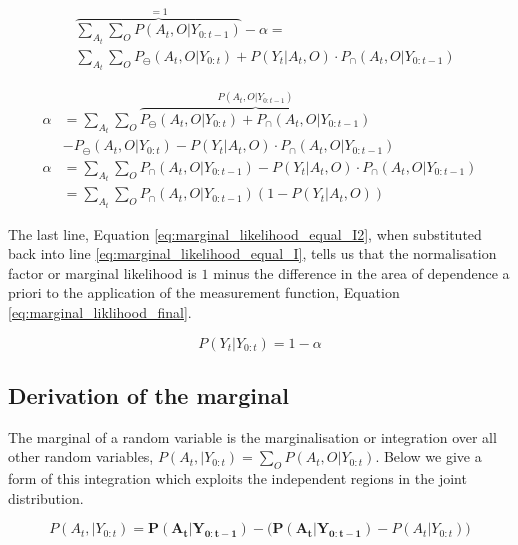 \begin{align}		  
 &\overbrace{\sum\limits_{A_t}\sum\limits_{O} P(A_t,O|Y_{0:t-1})}^{=1} - \alpha  = \nonumber \\ 
      &\sum\limits_{A_t}\sum\limits_{O} P_{\ominus}(A_t,O|Y_{0:t}) + P(Y_t|A_t,O)\cdot P_{\cap}(A_t,O|Y_{0:t-1})
\end{align}

\begin{align}   
   \alpha &= \sum\limits_{A_t}\sum\limits_{O}  \overbrace{P_{\ominus}(A_t,O|Y_{0:t}) + P_{\cap}(A_t,O|Y_{0:t-1})}^{P(A_t,O|Y_{0:t-1})}\nonumber\\ 
     & - P_{\ominus}(A_t,O|Y_{0:t}) - P(Y_t|A_t,O)\cdot P_{\cap}(A_t,O|Y_{0:t-1}) \\
    \alpha &= \sum\limits_{A_t}\sum\limits_{O} P_{\cap}(A_t,O|Y_{0:t-1}) - P(Y_t|A_t,O)\cdot P_{\cap}(A_t,O|Y_{0:t-1}) \\
	   &= \sum\limits_{A_t}\sum\limits_{O} P_{\cap}(A_t,O|Y_{0:t-1}) (1 - P(Y_t|A_t,O)) \label{eq:marginal_likelihood_equal_I2}
\end{align}

The last line, Equation \ref{eq:marginal_likelihood_equal_I2}, when substituted back into line \ref{eq:marginal_likelihood_equal_I}, tells us that the 
normalisation factor or marginal likelihood is $1$ minus the difference in the area of dependence a priori to the application of 
the measurement function, Equation \ref{eq:marginal_liklihood_final}.

\begin{equation}\label{eq:marginal_liklihood_final}
 P(Y_t|Y_{0:t}) = 1 - \alpha
\end{equation}


\subsection{Derivation of the marginal}\label{appendix:marginal}

The marginal of a random variable is the marginalisation or integration over all other random variables, $P(A_t,|Y_{0:t}) = \sum\limits_{O} P(A_t,O|Y_{0:t})$. Below 
we give a form of this integration which exploits the independent regions in the joint distribution.

\begin{equation} \label{eq:ch5:app:dummy}
 P(A_t,|Y_{0:t}) = \mathbf{P(A_t|Y_{0:t-1})} - \Big(\mathbf{P(A_t|Y_{0:t-1})} - P(A_t|Y_{0:t}) \Big) 
\end{equation}

